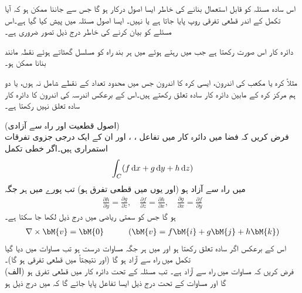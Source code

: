 اس سادہ مسئلہ کو قابل استعمال بنانے کی خاطر  ایسا اصول درکار ہو گا جس سے جاننا ممکن ہو کہ آیا تکمل کے اندر قطعی تفرقی روپ پایا جاتا ہے یا نہیں۔ ایسا اصول  مسئلہ  میں پیش کیا گیا ہے۔اس مسئلے کو بیان کرنے کی خاطر درج ذیل تصور ضروری ہے۔

دائرہ کار  اس صورت  رکھتا ہے جب  میں رہتے ہوئے   میں ہر بند راہ کو  مسلسل گھٹاتے ہوئے نقطہ مانند بنانا ممکن ہو۔ 

مثلاً کرہ یا مکعب کی اندرون، ایسی کرہ کا اندرون جس میں محدود تعداد کے نقطے شامل نہ ہوں، یا دو ہم مرکز کرہ کے مابین دائرہ کار سادہ تعلق رکھتے ہیں۔اس کے برعکس  اندرسہ کی اندرون کا دائرہ کار سادہ تعلق نہیں رکھتا ہے۔   

 \quad (اصول قطعیت اور راہ سے آزادی)\\
فرض کریں کہ فضا میں دائرہ کار  میں تفاعل ، ،  اور ان کے ایک درجی جزوی تفرقات استمراری ہیں۔اگر خطی تکمل
\begin{align}\label{مساوات_خطی_تکمل_اصول_قطعیت_الف}
\int_C (f\dif x+g\dif y+h\dif z)
\end{align}
 میں راہ سے آزاد ہو (اور یوں  میں  قطعی تفرق ہو) تب پورے  میں ہر جگہ 
\begin{align}\label{مساوات_خطی_تکمل_اصول_قطعیت_ب}
\frac{\partial h}{\partial y}=\frac{\partial g}{\partial z}, \quad \frac{\partial f}{\partial z}=\frac{\partial h}{\partial x},\quad 
\frac{\partial g}{\partial x}=\frac{\partial f}{\partial y}
\end{align}
ہو گا جس کو سمتی ریاضی میں درج ذیل لکھا جا سکتا ہے۔
\begin{align}\label{مساوات_خطی_تکمل_اصول_قطعیت_پ}
\nabla \times \bM{v}=\bM{0}\quad \quad \quad (\bM{v}=f\bM{i}+g\bM{j}+h\bM{k})
\end{align}
اس کے برعکس اگر  سادہ تعلق رکھتا ہو اور   میں ہر جگہ مساوات  درست ہو تب مساوات  میں دیا گیا تکمل  میں راہ سے آزاد ہو گا (اور نتیجتاً  میں  قطعی تفرقی ہو گا)۔
\\
(الف) فرض کریں کہ مساوات   میں راہ سے آزاد ہے۔ تب مسئلہ  کے تحت 
 دائرہ کار  میں قطعی تفرق ہو گا اور مساوات  کے تحت درج ذیل  ایسا تفاعل  پایا جائے گا  کہ  میں درج ذیل ہو

